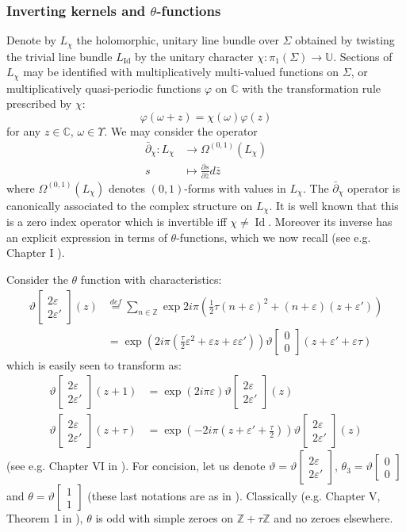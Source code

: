 \documentclass[10pt]{article}
\newcommand{\Z}{\mathbb{Z}}
\newcommand{\C}{\mathbb{C}}
\newcommand{\U}{\mathbb{U}}
\newcommand{\eps}{\varepsilon}
\newcommand{\dbar}{\bar\partial}
\DeclareMathOperator{\Id}{Id}
\newcommand{\thetaf}[2]{\vartheta\left [\begin{array}{c}#1\\#2\end{array}\right]}
\begin{document}
\subsubsection{Inverting kernels and $\theta$-functions}


Denote by $L_\chi$ the holomorphic, unitary line bundle over $\Sigma$ obtained by twisting the trivial line bundle $L_{\Id}$ by the unitary character $\chi:\pi_1(\Sigma)\rightarrow\U$. Sections of $L_\chi$ may be identified with multiplicatively multi-valued functions on $\Sigma$, or multiplicatively quasi-periodic functions $\varphi$ on $\C$ with the transformation rule prescribed by $\chi$: 
\begin{equation}\label{eq:chiquasiper}
\varphi(\omega+z)=\chi(\omega)\varphi(z)
\end{equation}
for any $z\in\C$, $\omega\in\Upsilon$. We may consider the operator
$$
\begin{array}{rl}
\dbar_\chi: L_\chi&\longrightarrow\Omega^{(0,1)}(L_\chi)\\
s&\longmapsto\frac{\partial s}{\partial \bar z}d\bar z
\end{array}$$
where %
$\Omega^{(0,1)}(L_\chi)$ denotes $(0,1)$-forms with values in $L_\chi$. The $\dbar_\chi$ operator is canonically associated to the complex structure on $L_\chi$. It is well known that this is a zero index operator which is invertible iff $\chi\neq\Id$. Moreover its inverse has an explicit expression in terms of $\theta$-functions, which we now recall (see e.g. Chapter I \cite{Fay_Theta}).

Consider the $\theta$ function with characteristics:
\begin{equation}\label{eq:thetachardef}
\begin{array}{rl}
\thetaf{2\eps}{2\eps'}(z)&\stackrel{def}{=}\sum_{n\in\Z}\exp
2i\pi\left(\frac 12 \tau(n+\eps)^2+(n+\eps)(z+\eps')
\right)\\
&=\exp(2i\pi(\frac\tau 2\eps^2+\eps z+\eps\eps'))\thetaf{0}{0}(z+\eps'+\eps\tau)
\end{array}
\end{equation}
which is easily seen to transform as:
\begin{equation}\label{eq:thetatransf}
\begin{array}{rl}
\thetaf{2\eps}{2\eps'}(z+1)&=\exp(2i\pi\eps)\thetaf{2\eps}{2\eps'}(z)\\
\thetaf{2\eps}{2\eps'}(z+\tau)&=\exp(-2i\pi(z+\eps'+\frac\tau 2))\thetaf{2\eps}{2\eps'}(z)
\end{array}
\end{equation}
(see e.g. Chapter VI in \cite{FarKra}). For concision, let us denote $\vartheta=\thetaf{2\eps}{2\eps'}$, $\theta_3=\thetaf{0}{0}$ and $\theta=\thetaf{1}{1}$ (these last notations are as in \cite{Chandra}). Classically (e.g. Chapter V, Theorem 1 in \cite{Chandra}), $\theta$ is odd with simple zeroes on $\Z+\tau\Z$ and no zeroes elsewhere.
\end{document}

